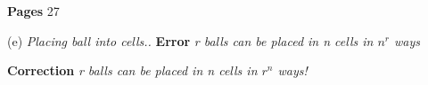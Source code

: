 \documentclass{article}
\begin{document}
\textbf{Pages} 27

(e) \textit{Placing ball into cells..}
\textbf{Error}  \textit {r balls can be placed in n cells in $n^r$ ways}

\textbf{Correction}  \textit{r balls can be placed in n cells in $r^n$ ways!}
\end{document}
